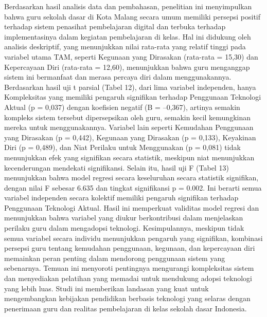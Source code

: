    Berdasarkan hasil analisis data dan pembahasan, penelitian ini menyimpulkan bahwa guru sekolah dasar di Kota Malang secara umum memiliki persepsi positif terhadap sistem penasihat pembelajaran digital dan terbuka terhadap implementasinya dalam kegiatan pembelajaran di kelas. Hal ini didukung oleh analisis deskriptif, yang menunjukkan nilai rata-rata yang relatif tinggi pada variabel utama TAM, seperti Kegunaan yang Dirasakan (rata-rata = 15,30) dan Kepercayaan Diri (rata-rata = 12,60), menunjukkan bahwa guru menganggap sistem ini bermanfaat dan merasa percaya diri dalam menggunakannya. Berdasarkan hasil uji t parsial (Tabel 12), dari lima variabel independen, hanya Kompleksitas yang memiliki pengaruh signifikan terhadap Penggunaan Teknologi Aktual (p = 0,037) dengan koefisien negatif (B = –0,367), artinya semakin kompleks sistem tersebut dipersepsikan oleh guru, semakin kecil kemungkinan mereka untuk menggunakannya. Variabel lain seperti Kemudahan Penggunaan yang Dirasakan (p = 0,442), Kegunaan yang Dirasakan (p = 0,133), Keyakinan Diri (p = 0,489), dan Niat Perilaku untuk Menggunakan (p = 0,081) tidak menunjukkan efek yang signifikan secara statistik, meskipun niat menunjukkan kecenderungan mendekati signifikansi. Selain itu, hasil uji F (Tabel 13) menunjukkan bahwa model regresi secara keseluruhan secara statistik signifikan, dengan nilai F sebesar 6.635 dan tingkat signifikansi p = 0.002. Ini berarti semua variabel independen secara kolektif memiliki pengaruh signifikan terhadap Penggunaan Teknologi Aktual. Hasil ini memperkuat validitas model regresi dan menunjukkan bahwa variabel yang diukur berkontribusi dalam menjelaskan perilaku guru dalam mengadopsi teknologi. Kesimpulannya, meskipun tidak semua variabel secara individu menunjukkan pengaruh yang signifikan, kombinasi persepsi guru tentang kemudahan penggunaan, kegunaan, dan kepercayaan diri memainkan peran penting dalam mendorong penggunaan sistem yang sebenarnya. Temuan ini menyoroti pentingnya mengurangi kompleksitas sistem dan menyediakan pelatihan yang memadai untuk mendukung adopsi teknologi yang lebih luas. Studi ini memberikan landasan yang kuat untuk mengembangkan kebijakan pendidikan berbasis teknologi yang selaras dengan penerimaan guru dan realitas pembelajaran di kelas sekolah dasar Indonesia.
